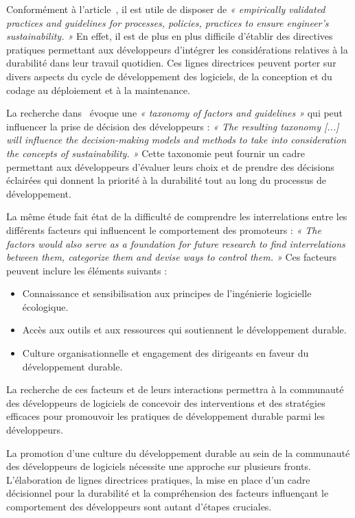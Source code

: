 Conformément à l'article~\cite{SustainableEngNeglectedPerspective}, il est utile de disposer de \emph{« empirically validated practices and guidelines for processes, policies, practices to ensure engineer’s sustainability. »} En effet, il est de plus en plus difficile d'établir des directives pratiques permettant aux développeurs d'intégrer les considérations relatives à la durabilité dans leur travail quotidien. Ces lignes directrices peuvent porter sur divers aspects du cycle de développement des logiciels, de la conception et du codage au déploiement et à la maintenance.


La recherche dans~\cite{SustainableEngNeglectedPerspective} évoque une \emph{« taxonomy of factors and guidelines »} qui peut influencer la prise de décision des développeurs : \emph{« The resulting taxonomy [...] will influence the decision-making models and methods to take into consideration the concepts of sustainability. »} Cette taxonomie peut fournir un cadre permettant aux développeurs d'évaluer leurs choix et de prendre des décisions éclairées qui donnent la priorité à la durabilité tout au long du processus de développement.


La même étude fait état de la difficulté de comprendre les interrelations entre les différents facteurs qui influencent le comportement des promoteurs : \emph{« The factors would also serve as a foundation for future research to find interrelations between them, categorize them and devise ways to control them. »} Ces facteurs peuvent inclure les éléments suivants :
\begin{itemize}
    \item Connaissance et sensibilisation aux principes de l'ingénierie logicielle écologique.
    \item Accès aux outils et aux ressources qui soutiennent le développement durable.
    \item Culture organisationnelle et engagement des dirigeants en faveur du développement durable.
\end{itemize}
La recherche de ces facteurs et de leurs interactions permettra à la communauté des développeurs de logiciels de concevoir des interventions et des stratégies efficaces pour promouvoir les pratiques de développement durable parmi les développeurs.


La promotion d'une culture du développement durable au sein de la communauté des développeurs de logiciels nécessite une approche sur plusieurs fronts.  L'élaboration de lignes directrices pratiques, la mise en place d'un cadre décisionnel pour la durabilité et la compréhension des facteurs influençant le comportement des développeurs sont autant d'étapes cruciales.

